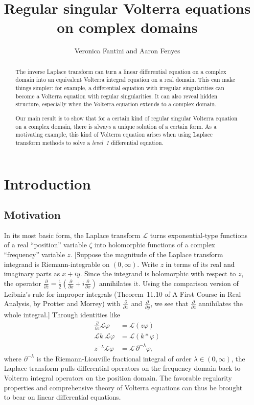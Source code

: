 \documentclass{article}
\title{Regular singular Volterra equations on complex domains}
\author{Veronica Fantini and Aaron Fenyes}
\date{}
\theoremstyle{plain}
\newcommand{\laplace}{\mathcal{L}}
\newenvironment{verify}{\color{ForestGreen}}{\color{black}}
\begin{document}
\maketitle

\begin{abstract}
The inverse Laplace transform can turn a linear differential equation on a complex domain into an equivalent Volterra integral equation on a real domain. This can make things simpler: for example, a differential equation with irregular singularities can become a Volterra equation with regular singularities. It can also reveal hidden structure, especially when the Volterra equation extends to a complex domain.

Our main result is to show that for a certain kind of regular singular Volterra equation on a complex domain, there is always a unique solution of a certain form. As a motivating example, this kind of Volterra equation arises when using Laplace transform methods to solve a {\em level~1} differential equation.
\end{abstract}
\tableofcontents
\section{Introduction}\label{sec:intro}
\subsection{Motivation}\label{motivation}
In its most basic form, the Laplace transform $\laplace$ turns exponential-type functions of a real ``position'' variable $\zeta$ into holomorphic functions of a complex ``frequency'' variable $z$. \begin{verify}[Suppose the magnitude of the Laplace transform integrand is Riemann-integrable on $(0, \infty)$. Write $z$ in terms of its real and imaginary parts as $x + iy$. Since the integrand is holomorphic with respect to $z$, the operator $\frac{\partial}{\partial\overline{z}} = \frac{1}{2}\left(\frac{\partial}{\partial x} + i\frac{\partial}{\partial x}\right)$ annihilates it. Using the comparison version of Leibniz's rule for improper integrals (Theorem~11.10 of A First Course in Real Analysis, by Protter and Morrey) with $\frac{\partial}{\partial x}$ and $\frac{\partial}{\partial y}$, we see that $\frac{\partial}{\partial\overline{z}}$ annihilates the whole integral.]\end{verify} Through identities like
\begin{align*}
\frac{\partial}{\partial z} \laplace \varphi & = \laplace(z\varphi) \\
\laplace k\;\laplace \varphi & = \laplace(k * \varphi) \\
z^{-\lambda} \laplace \varphi & = \laplace\,\partial^{-\lambda} \varphi,
\end{align*}
where $\partial^{-\lambda}$ is the Riemann-Liouville fractional integral of order $\lambda \in (0, \infty)$, the Laplace transform pulls differential operators on the frequency domain back to Volterra integral operators on the position domain. The favorable regularity properties and comprehensive theory of Volterra equations can thus be brought to bear on linear differential equations.
\end{document}
